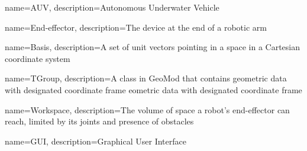 {
        name=AUV,
        description={Autonomous Underwater Vehicle}
}

{
        name=End-effector,
        description={The device at the end of a robotic arm}
}


{
        name=Basis,
        description={A set of unit vectors pointing in a space in a Cartesian coordinate system}
}

{
        name=TGroup,
        description={A class in GeoMod that contains geometric data with designated coordinate frame eometric data with designated coordinate frame}
}

{
        name=Workspace,
        description={The volume of space a robot's end-effector can reach, limited by its joints and presence of obstacles}
}

{
        name=GUI,
        description={Graphical User Interface}
}
